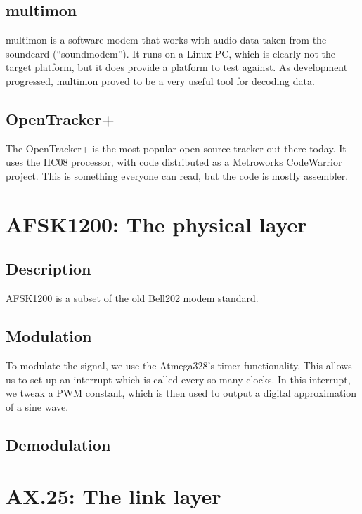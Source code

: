 \documentclass{article}
\begin{document}
\subsection{multimon}

multimon\cite{multimon} is a software modem that works with audio data taken from the
soundcard (``soundmodem'').  It runs on a Linux PC, which is clearly
not the target platform, but it does provide a platform to test
against.  As development progressed, multimon proved to be a very
useful tool for decoding data.

\subsection{OpenTracker+}

The OpenTracker+\cite{opentracker} is the most popular open source
\aprs tracker out there today.  It uses the HC08 processor, with code
distributed as a Metroworks CodeWarrior project.  This is something
everyone can read, but the code is mostly assembler.



\section{AFSK1200: The physical layer}

\subsection{Description}

AFSK1200 is a subset of the old Bell202 modem standard\cite{ruafsk1200}.

\subsection{Modulation}

To modulate the signal, we use the Atmega328's timer functionality.
This allows us to set up an interrupt which is called every so many
clocks.  In this interrupt, we tweak a PWM constant, which is then
used to output a digital approximation of a sine wave.


\subsection{Demodulation}

\section{AX.25: The link layer}
\end{document}
